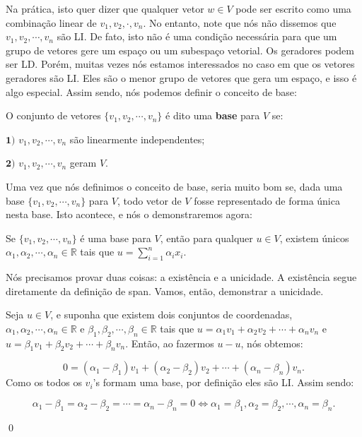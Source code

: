 Na prática, isto quer dizer que qualquer vetor $w\in V$ pode ser escrito como uma combinação linear de $v_1, v_2, \cdot, v_n$. No entanto, note que nós não dissemos que $v_1, v_2, \cdots, v_n$ são LI. De fato, isto não é uma condição necessária para que um grupo de vetores gere um espaço ou um subespaço vetorial. Os geradores podem ser LD. Porém, muitas vezes nós estamos interessados no caso em que os vetores geradores são LI. Eles são o menor grupo de vetores que gera um espaço, e isso é algo especial. Assim sendo, nós podemos definir o conceito de base:

\begin{Definition}
	O conjunto de vetores $\{v_1, v_2, \cdots, v_n\}$ é dito uma \textbf{base} para $V$ se:
	
	$\mathbf{1)}$ $v_1, v_2, \cdots, v_n$ são linearmente independentes;
	
	$\mathbf{2)}$ $v_1, v_2, \cdots, v_n$ geram $V$.
\end{Definition}

Uma vez que nós definimos o conceito de base, seria muito bom se, dada uma base $\{v_1, v_2, \cdots, v_n\}$ para $V$, todo vetor de $V$ fosse representado de forma única nesta base. Isto acontece, e nós o demonstraremos agora:

\begin{Proposition}
	Se $\{v_1, v_2, \cdots, v_n\}$ é uma base para $V$, então para qualquer $u\in V$, existem únicos $\alpha_1, \alpha_2, \cdots, \alpha_n\in\mathbb{R}$ tais que $u = \sum\limits_{i = 1}^{n} \alpha_ix_i$.
\end{Proposition}

\begin{Proof}
	Nós precisamos provar duas coisas: a existência e a unicidade. A existência segue diretamente da definição de span. Vamos, então, demonstrar a unicidade.
	
	Seja $u\in V$, e suponha que existem dois conjuntos de coordenadas, $\alpha_1, \alpha_2, \cdots, \alpha_n\in\mathbb{R}$ e $\beta_1, \beta_2, \cdots, \beta_n\in\mathbb{R}$ tais que $u = \alpha_1v_1 + \alpha_2v_2 + \cdots + \alpha_nv_n$ e $u = \beta_1v_1 + \beta_2v_2 + \cdots + \beta_nv_n$. Então, ao fazermos $u - u$, nós obtemos:
	
	$$
	0 = (\alpha_1 - \beta_1)v_1 + (\alpha_2 - \beta_2)v_2 + \cdots + (\alpha_n - \beta_n)v_n.
	$$
	Como os todos os $v_i$'s formam uma base, por definição eles são LI. Assim sendo:
	
	$$
	\alpha_1 - \beta_1 = \alpha_2 - \beta_2 = \cdots = \alpha_n - \beta_n = 0 \iff \alpha_1 = \beta_1, \alpha_2 = \beta_2, \cdots, \alpha_n = \beta_n.
	$$
	
	\qed
\end{Proof}

